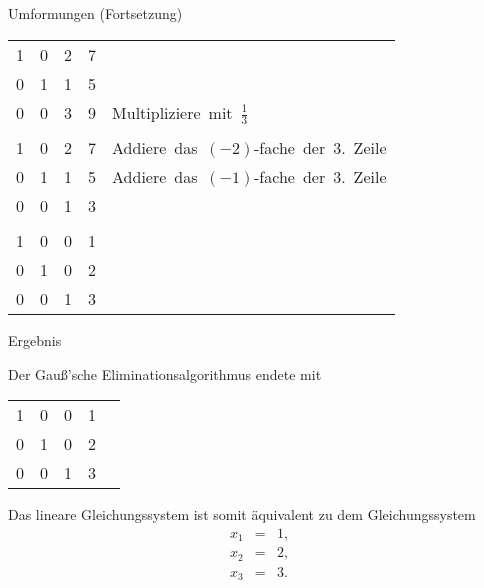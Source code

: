 \documentclass[german]{beamer}
\newcommand{\bq}{\begin{eqnarray*}}
\newcommand{\eq}{\end{eqnarray*}}
\begin{document}
\begin{frame}{Umformungen (Fortsetzung)}

\begin{center}
\begin{tabular}{rrr|rl}
 1 &  0 &  2 & 7 & \\
 0 &  1 &  1 & 5 & \\
 0 &  0 &  3 & 9 & \mbox{Multipliziere mit $\frac{1}{3}$} \\
 & & & & \\
 1 &  0 &  2 & 7 & \mbox{Addiere das $(-2)$-fache der 3. Zeile} \\
 0 &  1 &  1 & 5 & \mbox{Addiere das $(-1)$-fache der 3. Zeile} \\
 0 &  0 &  1 & 3 & \\
 & & & & \\
 1 &  0 &  0 & 1 & \\
 0 &  1 &  0 & 2 & \\
 0 &  0 &  1 & 3 & \\
\end{tabular}
\end{center}

\end{frame}

\begin{frame}{Ergebnis}

Der Gau{\ss}'sche Eliminationsalgorithmus endete mit
\begin{center}
\begin{tabular}{rrr|rl}
 1 &  0 &  0 & 1 & \\
 0 &  1 &  0 & 2 & \\
 0 &  0 &  1 & 3 & \\
\end{tabular}
\end{center}
Das lineare Gleichungssystem ist somit \"aquivalent zu dem Gleichungssystem
\bq
 x_1 & = & 1, \nonumber \\
 x_2 & = & 2, \nonumber \\
 x_3 & = & 3.
\eq

\end{frame}
\end{document}
